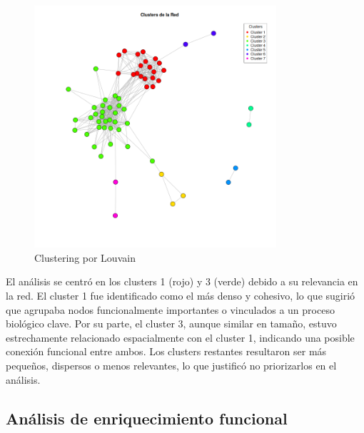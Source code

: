 \begin{figure}[h!]
	\includegraphics[width=0.8\textwidth]{figures/network_clusters_colored.png}
	\caption{Clustering por Louvain}
	\label{fig:Clustering}
\end{figure}

El análisis se centró en los clusters 1 (rojo) y 3 (verde) debido a su relevancia en la red. El cluster 1 fue identificado como el más denso y cohesivo, lo que sugirió que agrupaba nodos funcionalmente importantes o vinculados a un proceso biológico clave. Por su parte, el cluster 3, aunque similar en tamaño, estuvo estrechamente relacionado espacialmente con el cluster 1, indicando una posible conexión funcional entre ambos. Los clusters restantes resultaron ser más pequeños, dispersos o menos relevantes, lo que justificó no priorizarlos en el análisis.

\subsection{Análisis de enriquecimiento funcional}

